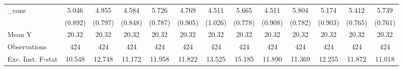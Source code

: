 {\begin{tabular}{l*{12}{c}}
\addlinespace
\_cons      &       5.046\sym{***}&       4.955\sym{***}&       4.584\sym{***}&       5.726\sym{***}&       4.769\sym{***}&       4.511\sym{***}&       5.665\sym{***}&       4.511\sym{***}&       5.804\sym{***}&       5.174\sym{***}&       5.412\sym{***}&       5.739\sym{***}\\
            &     (0.892)         &     (0.797)         &     (0.848)         &     (0.787)         &     (0.905)         &     (1.026)         &     (0.778)         &     (0.908)         &     (0.782)         &     (0.903)         &     (0.765)         &     (0.761)         \\
\midrule
Mean Y      &       20.32         &       20.32         &       20.32         &       20.32         &       20.32         &       20.32         &       20.32         &       20.32         &       20.32         &       20.32         &       20.32         &       20.32         \\
Observations&         424         &         424         &         424         &         424         &         424         &         424         &         424         &         424         &         424         &         424         &         424         &         424         \\
Exc. Inst. F-stat&      10.548         &      12.748         &      11.172         &      11.958         &      11.822         &      13.525         &      15.185         &      11.890         &      11.369         &      12.255         &      11.872         &      11.018         \\
\bottomrule
\end{tabular}
}
